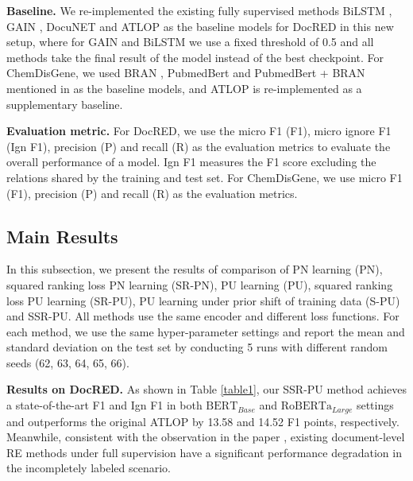 \documentclass[11pt]{article}
\begin{document}
\textbf{Baseline.} \enspace We re-implemented the existing fully supervised methods BiLSTM \citep{yao-etal-2019-docred}, GAIN \citep{zeng-etal-2020-double}, DocuNET \citep{ijcai2021p551} and ATLOP \citep{Zhou_Huang_Ma_Huang_2021} as the baseline models for DocRED in this new setup, where for GAIN and BiLSTM we use a fixed threshold of 0.5 and all methods take the final result of the model instead of the best checkpoint. For ChemDisGene, we used BRAN \citep{verga-etal-2018-simultaneously}, PubmedBert \citep{10.1145/3458754} and PubmedBert + BRAN mentioned in \citep{ zhang-etal-2022-distant} as the baseline models, and ATLOP is re-implemented as a supplementary baseline.

\textbf{Evaluation metric.} \enspace For DocRED, we use the micro F1 (F1), micro ignore F1 (Ign F1), precision (P) and recall (R) as the evaluation metrics to evaluate the overall performance of a model. Ign F1 measures the F1 score excluding the relations shared by the training and test set. \enspace For ChemDisGene, we use  micro F1 (F1), precision (P) and recall (R) as the evaluation metrics.

\subsection{Main Results}
In this subsection, we present the results of comparison of PN learning (PN), squared ranking loss PN learning (SR-PN), PU learning (PU), squared ranking loss PU learning (SR-PU), PU learning under prior shift of training data (S-PU) and SSR-PU. All methods use the same encoder and different loss functions. For each method, we use the same hyper-parameter settings and report the mean and standard deviation on the test set by conducting 5 runs with different random seeds (62, 63, 64, 65, 66).

\textbf{Results on DocRED.} \enspace As shown in Table \ref{table1}, our SSR-PU method achieves a state-of-the-art F1 and Ign F1 in both $\mathrm{BERT}_{Base}$ and $\mathrm{RoBERTa}_{Large}$ settings and outperforms the original ATLOP by 13.58 and 14.52 F1 points, respectively. Meanwhile, consistent with the observation in the paper \citep{huang-etal-2022-recommend}, existing document-level RE methods under full supervision have a significant performance degradation in the incompletely labeled scenario.
\end{document}
